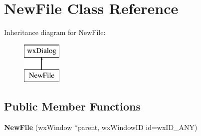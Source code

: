 \hypertarget{class_new_file}{\section{New\+File Class Reference}
\label{class_new_file}
}
Inheritance diagram for New\+File\+:\begin{figure}[H]
\begin{center}
\leavevmode
\includegraphics[height=2.000000cm]{class_new_file}
\end{center}
\end{figure}
\subsection*{Public Member Functions}
\begin{DoxyCompactItemize}
\item 
\hypertarget{class_new_file_a3c3de6b98a37f5a2a8123d1ade4d7dbc}{{\bfseries New\+File} (wx\+Window $\ast$parent, wx\+Window\+I\+D id=wx\+I\+D\+\_\+\+A\+N\+Y)}\label{class_new_file_a3c3de6b98a37f5a2a8123d1ade4d7dbc}

\end{DoxyCompactItemize}
